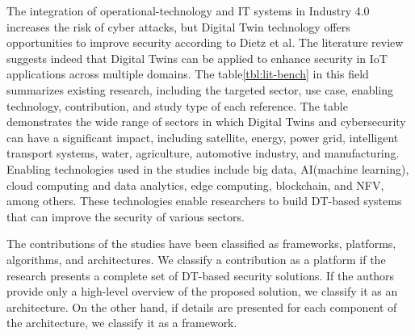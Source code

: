 The integration of operational-technology and IT systems in Industry 4.0 increases the risk of cyber attacks, but Digital Twin technology offers opportunities to improve security according to Dietz et al\cite{dietzHarnessingDigitalTwin2022}. The literature review suggests indeed that Digital Twins can be applied to enhance security in IoT applications across multiple domains. The table\ref{tbl:lit-bench} in this field summarizes existing research, including the targeted sector, use case, enabling technology, contribution, and study type of each reference. The table demonstrates the wide range of sectors in which Digital Twins and cybersecurity can have a significant impact, including satellite, energy, power grid, intelligent transport systems, water, agriculture, automotive industry, and manufacturing. Enabling technologies used in the studies include big data,  AI(machine learning), cloud computing and data analytics, edge computing, blockchain, and NFV, among others. These technologies enable researchers to build DT-based systems that can improve the security of various sectors.

The contributions of the studies have been classified as frameworks, platforms, algorithms, and architectures. We classify a contribution as a platform if the research presents a complete set of DT-based security solutions. If the authors provide only a high-level overview of the proposed solution, we classify it as an architecture. On the other hand, if details are presented for each component of the architecture, we classify it as a framework.

